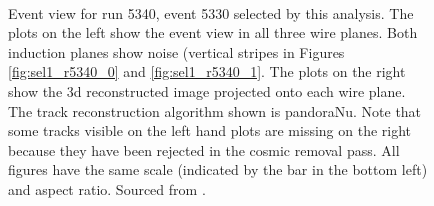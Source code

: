 \begin{figure}[htbp]
\begin{adjustwidth}{-1cm}{-1cm}
 \\   
\caption[Event View for Run 5340, Event 5330]{Event view for run 5340, event 5330 selected by this analysis. The plots on the left show the event view in all three wire planes. Both induction planes show noise (vertical stripes in Figures \ref{fig:sel1_r5340_0} and \ref{fig:sel1_r5340_1}. The plots on the right show the \gls{3d} reconstructed image projected onto each wire plane. The track reconstruction algorithm shown is pandoraNu. Note that some tracks visible on the left hand plots are missing on the right because they have been rejected in the cosmic removal pass. All figures have the same scale (indicated by the bar in the bottom left) and aspect ratio. Sourced from \cite{MicroBooNECCInclPN}.}
\label{fig:sel1_r5340}
\end{adjustwidth}
\end{figure}

